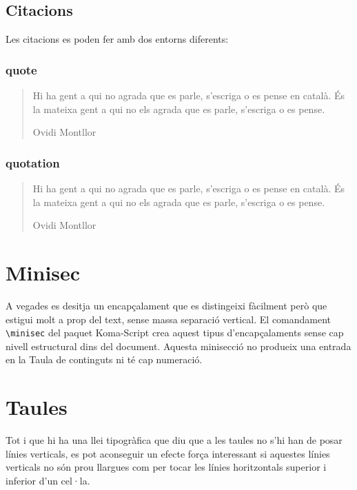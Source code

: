 \documentclass[a4paper,
                             twoside,
                             BCOR1.0cm,
                             DIV11,
                             parskip=full,
                             11pt]{scrbook}
\begin{document}
\subsection{Citacions}\label{sbsec:citacio}
Les citacions es poden fer amb dos entorns diferents:
\subsubsection{quote}\label{sbsec:quote}

\begin{quote}
Hi ha gent a qui no agrada que es parle, s’escriga o es pense en català. És la mateixa gent a qui no els agrada que es parle, s’escriga o es pense.

Ovidi Montllor
\end{quote}

\subsubsection{quotation}\label{sbsec:quotation}
\begin{quotation}
Hi ha gent a qui no agrada que es parle, s’escriga o es pense en català. És la mateixa gent a qui no els agrada que es parle, s’escriga o es pense.

Ovidi Montllor
\end{quotation}

\section{Minisec}\label{sec:minisec}
A vegades es desitja un encapçalament que es distingeixi fàcilment però que estigui molt a prop del text, sense massa separació vertical. El comandament \verb+\minisec+ del paquet Koma-Script crea  aquest tipus d'encapçalaments sense cap nivell estructural dins del document. Aquesta minisecció no produeix una entrada en la Taula de continguts ni té cap numeració. 

\lipsum[1-2]

\section{Taules}\label{sec:taules}

Tot i que hi ha una llei tipogràfica que diu que a les taules no s'hi han de posar línies verticals, es pot aconseguir un efecte força interessant si aquestes línies verticals no són prou llargues com per tocar les línies horitzontals superior i inferior d'un cel·la. 
\end{document}
